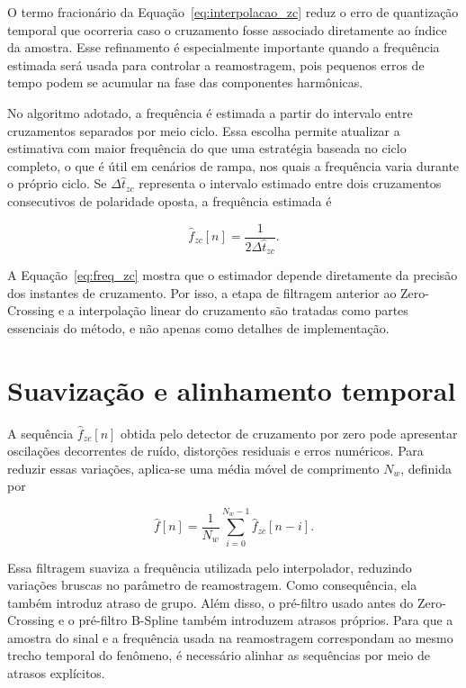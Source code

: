 O termo fracionário da Equação~\eqref{eq:interpolacao_zc} reduz o erro de quantização temporal que ocorreria caso o cruzamento fosse associado diretamente ao índice da amostra. Esse refinamento é especialmente importante quando a frequência estimada será usada para controlar a reamostragem, pois pequenos erros de tempo podem se acumular na fase das componentes harmônicas.

No algoritmo adotado, a frequência é estimada a partir do intervalo entre cruzamentos separados por meio ciclo. Essa escolha permite atualizar a estimativa com maior frequência do que uma estratégia baseada no ciclo completo, o que é útil em cenários de rampa, nos quais a frequência varia durante o próprio ciclo. Se $\Delta \hat{t}_{zc}$ representa o intervalo estimado entre dois cruzamentos consecutivos de polaridade oposta, a frequência estimada é

\begin{equation}
\hat{f}_{zc}[n] = \frac{1}{2\Delta \hat{t}_{zc}}.
\label{eq:freq_zc}
\end{equation}

A Equação~\eqref{eq:freq_zc} mostra que o estimador depende diretamente da precisão dos instantes de cruzamento. Por isso, a etapa de filtragem anterior ao Zero-Crossing e a interpolação linear do cruzamento são tratadas como partes essenciais do método, e não apenas como detalhes de implementação.

\section{Suavização e alinhamento temporal}

A sequência $\hat{f}_{zc}[n]$ obtida pelo detector de cruzamento por zero pode apresentar oscilações decorrentes de ruído, distorções residuais e erros numéricos. Para reduzir essas variações, aplica-se uma média móvel de comprimento $N_w$, definida por

\begin{equation}
\hat{f}[n] = \frac{1}{N_w}\sum_{i=0}^{N_w-1}\hat{f}_{zc}[n-i].
\label{eq:media_movel_freq}
\end{equation}

Essa filtragem suaviza a frequência utilizada pelo interpolador, reduzindo variações bruscas no parâmetro de reamostragem. Como consequência, ela também introduz atraso de grupo. Além disso, o pré-filtro usado antes do Zero-Crossing e o pré-filtro B-Spline também introduzem atrasos próprios. Para que a amostra do sinal e a frequência usada na reamostragem correspondam ao mesmo trecho temporal do fenômeno, é necessário alinhar as sequências por meio de atrasos explícitos.

